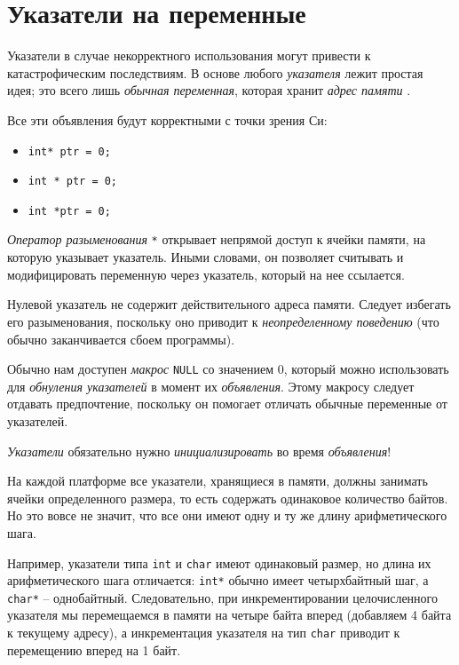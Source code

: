 \documentclass[%
	11pt,
	a4paper,
	utf8,
		]{article}
\begin{document}
\section{Указатели на переменные}

Указатели в случае некорректного использования могут привести к катастрофическим последствиям. В основе любого \emph{указателя} лежит простая идея; это всего лишь \emph{обычная переменная}, которая хранит \emph{адрес памяти} \cite[]{amini-extreme-c:2022}.

Все эти объявления будут корректными с точки зрения Си:
\begin{itemize}
	\item \verb|int* ptr = 0;|
	
	\item \verb|int * ptr = 0;|
	
	\item \verb|int *ptr = 0;|
\end{itemize}

\emph{Оператор разыменования} \verb|*| открывает непрямой доступ к ячейки памяти, на которую указывает указатель. Иными словами, он позволяет считывать и модифицировать переменную через указатель, который на нее ссылается.

Нулевой указатель не содержит действительного адреса памяти. Следует избегать его разыменования, поскольку оно приводит к \emph{неопределенному поведению} (что обычно заканчивается сбоем программы).

Обычно нам доступен \emph{макрос} \verb|NULL| со значением 0, который можно использовать для \emph{обнуления указателей} в момент их \emph{объявления}. Этому макросу следует отдавать предпочтение, поскольку он помогает отличать обычные переменные от указателей.

{\color{blue}\emph{Указатели} обязательно нужно \emph{инициализировать} во время \emph{объявления}!}

На каждой платформе все указатели, хранящиеся в памяти, должны занимать ячейки определенного размера, то есть содержать одинаковое количество байтов. Но это вовсе не значит, что все они имеют одну и ту же длину арифметического шага.

Например, указатели типа \verb|int| и \verb|char| имеют одинаковый размер, но длина их арифметического шага отличается: \verb|int*| обычно имеет четырхбайтный шаг, а \verb|char*| -- однобайтный. Следовательно, при инкрементировании целочисленного указателя мы перемещаемся в памяти на четыре байта вперед (добавляем 4 байта к текущему адресу), а инкрементация указателя на тип \verb|char| приводит к перемещению вперед на 1 байт.
\end{document}

